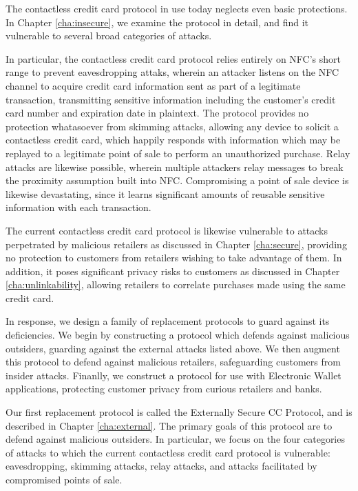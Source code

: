 The contactless credit card protocol in use today neglects even basic protections.
In Chapter \ref{cha:insecure}, we examine the protocol in detail, and find it vulnerable to several broad categories of attacks.

In particular, the contactless credit card protocol relies entirely on NFC's short range to prevent eavesdropping attaks,
    wherein an attacker listens on the NFC channel to acquire credit card information sent as part of a legitimate transaction,
    transmitting sensitive information including the customer's credit card number and expiration date in plaintext.
The protocol provides no protection whatasoever from skimming attacks,
    allowing any device to solicit a contactless credit card, which happily responds with information which may be replayed to a legitimate point of sale to perform an unauthorized purchase.
Relay attacks are likewise possible, wherein multiple attackers relay messages to break the proximity assumption built into NFC.
Compromising a point of sale device is likewise devastating, since it learns significant amounts of reusable sensitive information with each transaction.

The current contactless credit card protocol is likewise vulnerable to attacks perpetrated by malicious retailers as discussed in Chapter \ref{cha:secure},
    providing no protection to customers from retailers wishing to take advantage of them.
In addition, it poses significant privacy risks to customers as discussed in Chapter \ref{cha:unlinkability}, allowing retailers to correlate purchases made using the same credit card.

In response, we design a family of replacement protocols to guard against its deficiencies.
We begin by constructing a protocol which defends against malicious outsiders, guarding against the external attacks listed above.
We then augment this protocol to defend against malicious retailers, safeguarding customers from insider attacks.
Finanlly, we construct a protocol for use with Electronic Wallet applications, protecting customer privacy from curious retailers and banks.


Our first replacement protocol is called the Externally Secure CC Protocol, and is described in Chapter \ref{cha:external}.
The primary goals of this protocol are to defend against malicious outsiders.
In particular, we focus on the four categories of attacks to which the current contactless credit card protocol is vulnerable:
    eavesdropping, skimming attacks, relay attacks, and attacks facilitated by compromised points of sale.

